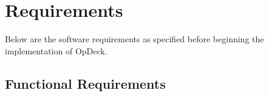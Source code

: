 \chapter{Requirements}

Below are the software requirements as specified before beginning the implementation of OpDeck.

\section{Functional Requirements}

\newcommand{\adminreq}[1]{\item \textbf{Admin} {#1}\stepcounter{AdminReq}}

\newcommand{\userreq}[1]{\item \textbf{User} {#1}\stepcounter{UserReq}}

\newcommand{\hpr}{\textit{High Priority}}
\newcommand{\mpr}{\textit{Medium Priority}}
\newcommand{\lpr}{\textit{Low Priority}}

